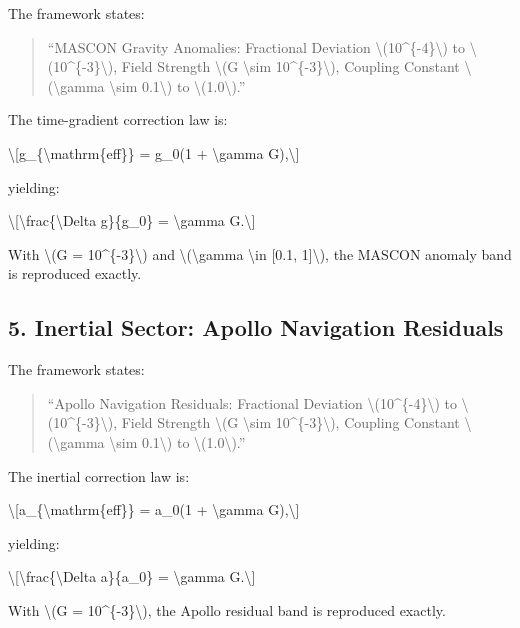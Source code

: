 \documentclass[
  10pt,
]{article}
\begin{document}
The framework states:

\begin{quote}
``MASCON Gravity Anomalies: Fractional Deviation
\textbackslash(10\^{}\{-4\}\textbackslash) to
\textbackslash(10\^{}\{-3\}\textbackslash), Field Strength
\textbackslash(G \textbackslash sim 10\^{}\{-3\}\textbackslash),
Coupling Constant \textbackslash(\textbackslash gamma \textbackslash sim
0.1\textbackslash) to \textbackslash(1.0\textbackslash).''
\end{quote}

The time-gradient correction law is:

\textbackslash{[}g\_\{\textbackslash mathrm\{eff\}\} = g\_0(1 +
\textbackslash gamma G),\textbackslash{]}

yielding:

\textbackslash{[}\textbackslash frac\{\textbackslash Delta g\}\{g\_0\} =
\textbackslash gamma G.\textbackslash{]}

With \textbackslash(G = 10\^{}\{-3\}\textbackslash) and
\textbackslash(\textbackslash gamma \textbackslash in {[}0.1,
1{]}\textbackslash), the MASCON anomaly band is reproduced exactly.

\hypertarget{inertial-sector-apollo-navigation-residuals}{%
\subsection{5. Inertial Sector: Apollo Navigation
Residuals}\label{inertial-sector-apollo-navigation-residuals}}

The framework states:

\begin{quote}
``Apollo Navigation Residuals: Fractional Deviation
\textbackslash(10\^{}\{-4\}\textbackslash) to
\textbackslash(10\^{}\{-3\}\textbackslash), Field Strength
\textbackslash(G \textbackslash sim 10\^{}\{-3\}\textbackslash),
Coupling Constant \textbackslash(\textbackslash gamma \textbackslash sim
0.1\textbackslash) to \textbackslash(1.0\textbackslash).''
\end{quote}

The inertial correction law is:

\textbackslash{[}a\_\{\textbackslash mathrm\{eff\}\} = a\_0(1 +
\textbackslash gamma G),\textbackslash{]}

yielding:

\textbackslash{[}\textbackslash frac\{\textbackslash Delta a\}\{a\_0\} =
\textbackslash gamma G.\textbackslash{]}

With \textbackslash(G = 10\^{}\{-3\}\textbackslash), the Apollo residual
band is reproduced exactly.
\end{document}
